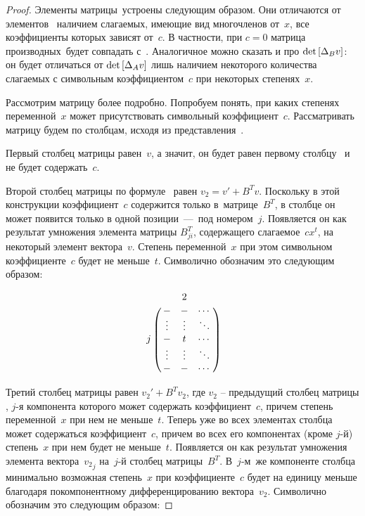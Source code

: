 \begin{proof}
Элементы матрицы~\diffMatrix[B] устроены следующим образом.
Они отличаются от элементов \diffMatrix\ наличием слагаемых, имеющие вид многочленов от~$x$, все коэффициенты которых зависят от~$c$.
В частности, при $c = 0$ матрица производных~\diffMatrix[B] будет совпадать с~\diffMatrix.
Аналогичное можно сказать и про $\mathop{\rm det} \text{$ [\Delta_B v] $}$: он будет отличаться от $\mathop{\rm det} \text{$ [\Delta_A v] $}$ 
лишь наличием некоторого количества слагаемых с символьным коэффициентом~$c$ при некоторых степенях~$x$.
\medskip

Рассмотрим матрицу \diffMatrix[B] более подробно. Попробуем понять, при каких степенях переменной~$x$ может присутствовать символьный коэффициент~$c$.
Рассматривать матрицу будем по столбцам, исходя из представления~.

Первый столбец матрицы \diffMatrix[B] равен~$v$, а значит, он будет равен первому столбцу \diffMatrix\ и не будет содержать~$c$.

Второй столбец матрицы \diffMatrix[B] по формуле~ равен $v_2 = v' + {B}^Tv$. Поскольку в этой конструкции коэффициент~$c$ 
содержится только в~матрице~${B}^T$, в столбце он может появится только в одной позиции~---~под номером~$j$. Появляется он как результат умножения
элемента матрицы $B^{T}_{ji}$, содержащего слагаемое~$cx^t$, на некоторый элемент вектора~$v$. Степень переменной~$x$ при этом символьном коэффициенте~$c$
будет не меньше~$t$. Символично обозначим это следующим образом:

\begin{equation*}
    \bordermatrix{
		&           & 2       &        \cr
		&   -       & -       & \cdots \cr
		&   \vdots  & \vdots  & \ddots \cr
		j & -       & t       & \cdots \cr
		&   \vdots  & \vdots  & \ddots \cr
		&   -       & -       & \cdots \cr
	}
\end{equation*}

Третий столбец матрицы равен $v_2' + {B}^Tv_2$, где $v_2$ -- предыдущий столбец матрицы \diffMatrix[B], $j$-я компонента которого может содержать коэффициент~$c$,
причем степень переменной~$x$ при нем не меньше~$t$.
Теперь уже во всех элементах столбца может содержаться коэффициент~$c$, причем во всех его компонентах (кроме $j$-й) степень~$x$ при нем будет не меньше~$t$.
Появляется он как результат умножения элемента вектора~${v_2}_j$ на~$j$-й столбец матрицы~$B^T$.
В~$j$-м~же компоненте столбца минимально возможная степень~$x$ при коэффициенте~$c$ будет на единицу меньше благодаря покомпонентному дифференцированию вектора~$v_2$.
Символично обозначим это следующим образом:


\end{proof}
